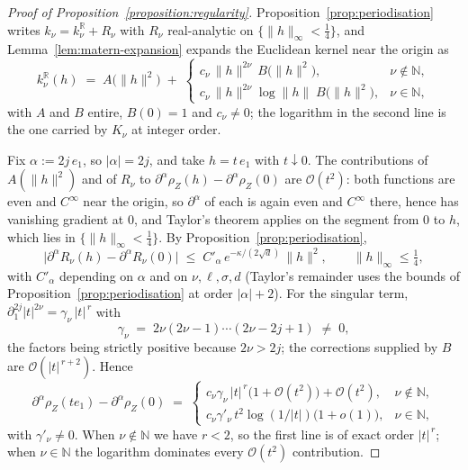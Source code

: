 \documentclass[pdflatex,sn-mathphys,Numbered]{sn-jnl}
\theoremstyle{thmstyleone}%
\theoremstyle{thmstyletwo}%
\theoremstyle{thmstylethree}%
\newcommand{\RR}{\mathbb{R}}
\newcommand{\NN}{\mathbb{N}}
\newcommand{\calO}{\mathcal{O}}
\begin{document}
\begin{appendices}
\begin{proof}[Proof of Proposition~\ref{proposition:regularity}]
Proposition~\ref{prop:periodisation} writes $k_\nu = k^{\RR}_\nu + R_\nu$ with
$R_\nu$ real-analytic on $\{\|h\|_\infty<\tfrac14\}$, and
Lemma~\ref{lem:matern-expansion} expands the Euclidean kernel near the origin as
\begin{equation}\label{eq:matern-local}
    k^{\RR}_\nu(h) \;=\; A\bigl(\|h\|^2\bigr) \;+\;
    \begin{cases}
        c_\nu\,\|h\|^{2\nu}\,B\bigl(\|h\|^2\bigr), & \nu \notin \NN, \\[3pt]
        c_\nu\,\|h\|^{2\nu}\log\|h\|\;B\bigl(\|h\|^2\bigr), & \nu \in \NN,
    \end{cases}
\end{equation}
with $A$ and $B$ entire, $B(0)=1$ and $c_\nu \neq 0$; the logarithm in the
second line is the one carried by $K_\nu$ at integer order.

Fix $\alpha := 2j\,e_1$, so $|\alpha| = 2j$, and take $h = t\,e_1$ with
$t \downarrow 0$. The contributions of $A(\|h\|^2)$ and of $R_\nu$ to
$\partial^{\alpha}\rho_Z(h) - \partial^{\alpha}\rho_Z(0)$ are $\calO(t^2)$: both
functions are even and $C^\infty$ near the origin, so $\partial^\alpha$ of each
is again even and $C^\infty$ there, hence has vanishing gradient at $0$, and
Taylor's theorem applies on the segment from $0$ to $h$, which lies in
$\{\|h\|_\infty<\tfrac14\}$. By
Proposition~\ref{prop:periodisation},
\begin{equation}\label{eq:remainder-increment}
    \bigl|\partial^\alpha R_\nu(h) - \partial^\alpha R_\nu(0)\bigr|
    \;\leq\; C'_\alpha\, e^{-\kappa/(2\sqrt d)}\,\|h\|^2 ,
    \qquad \|h\|_\infty \leq \tfrac14 ,
\end{equation}
with $C'_\alpha$ depending on $\alpha$ and on $\nu,\ell,\sigma,d$ (Taylor's
remainder uses the bounds of Proposition~\ref{prop:periodisation} at order
$|\alpha|+2$).
For the singular term, $\partial_1^{2j}|t|^{2\nu} = \gamma_\nu\,|t|^{\,r}$ with
\[
    \gamma_\nu \;=\; 2\nu(2\nu-1)\cdots(2\nu-2j+1) \;\neq\; 0 ,
\]
the factors being strictly positive because $2\nu > 2j$; the corrections
supplied by $B$ are $\calO(|t|^{\,r+2})$. Hence
\begin{equation}\label{eq:exact-increment}
    \partial^{\alpha}\rho_Z(t e_1) - \partial^{\alpha}\rho_Z(0)
    \;=\;
    \begin{cases}
        c_\nu\gamma_\nu\,|t|^{\,r}\bigl(1+\calO(t^2)\bigr) + \calO(t^2),
            & \nu \notin \NN, \\[3pt]
        c_\nu\gamma'_\nu\,t^{2}\log(1/|t|)\bigl(1+o(1)\bigr),
            & \nu \in \NN,
    \end{cases}
\end{equation}
with $\gamma'_\nu \neq 0$. When $\nu \notin \NN$ we have $r < 2$, so the first
line is of exact order $|t|^{\,r}$; when $\nu \in \NN$ the logarithm dominates
every $\calO(t^2)$ contribution.


\end{proof}
\end{appendices}
\end{document}
